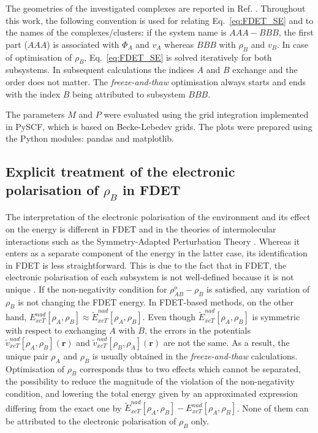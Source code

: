 \documentclass[amsmath,amssymb,preprint,aip,jcp]{revtex4-1}
\begin{document}
The geometries of the investigated complexes are reported in Ref. . 
Throughout this work, the following convention is used for relating Eq.~\ref{eq:FDET_SE} and to the names of the complexes/clusters: if the system name is $AAA-BBB$, the first part ($AAA$) is associated with $\Phi_A$ and  $v_A$ whereas $BBB$ with $\rho_B$ and $v_B$.
In case of optimisation of $\rho_B$, Eq.~\ref{eq:FDET_SE} is solved 
iteratively for both subsystems. In subsequent calculations the indices $A$ and $B$ exchange and the order does not matter.
The \textit{freeze-and-thaw} optimisation always starts and ends with the index $B$ being attributed to subsystem $BBB$. 
 
The parameters $M$ and $P$ were evaluated using the grid integration implemented in PySCF\cite{PYSCF}, which is based on Becke\cite{Becke1988b}-Lebedev\cite{Lebedev1999} grids. 
The plots were prepared using the Python modules: pandas\cite{PANDAS} and matplotlib\cite{Hunter2007}.

\subsection{Explicit treatment of the electronic polarisation of $\rho_B$ in FDET}\label{sect:pol_treat}
The interpretation of the electronic polarisation of the environment and its effect on the energy is different in FDET and in the theories of intermolecular interactions such as the Symmetry-Adapted Perturbation Theory \cite{Jeziorski1994}. Whereas it enters as a separate component of the energy in the latter case, its identification in FDET is less straightforward.
This is due to the fact that in FDET, the electronic polarisation of each subsystem is not well-defined because it is not unique \cite{Savin2009,HumbertDroz2014}. 
If  the non-negativity condition for $\rho^{o}_{AB}-\rho_B$ is satisfied, any variation of $\rho_B$ is not changing the FDET energy. In FDET-based methods, on the other hand, ${E}_{xcT}^{nad}[\rho_A,\rho_B]\approx \tilde{E}_{xcT}^{nad}[\rho_A,\rho_B]$. 
Even though $\tilde{E}_{xcT}^{nad}[\rho_A,\rho_B]$
is symmetric with respect to exchanging $A$ with $B$, 
the errors in the potentials $\tilde{v}_{xcT}^{nad}[\rho_A,\rho_B](\mathbf{r})$ and $\tilde{v}_{xcT}^{nad}[\rho_B,\rho_A](\mathbf{r})$
 are not the same. 
As a result, the unique pair $\rho_A$ and $\rho_B$ is usually obtained in the \textit{freeze-and-thaw} calculations.\cite{Wesolowski1997a,Dulak2007a} 
Optimisation of $\rho_B$ corresponds thus to two effects which cannot be separated, the possibility to reduce the magnitude of the violation of the non-negativity condition, and lowering the total energy given by an approximated expression differing from the exact one by $\tilde{E}_{xcT}^{nad}[\rho_A,\rho_B]-{E}_{xcT}^{nad}[\rho_A,\rho_B]$. 
None of them can be attributed to the electronic polarisation of $\rho_B$ only. 
\end{document}
